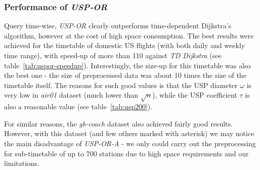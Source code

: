 	\subsubsection{Performance of \textit{USP-OR}}
		
		Query time-wise, \textit{USP-OR} clearly outperforms time-dependent Dijkstra's algorithm, however at the cost of high space consumption. The best results were achieved for the timetable of domestic US flights (with both daily and weekly time range), with speed-up of more than 110 against \textit{TD Dijkstra} (see table~\ref{tab:uspor-speedup}). Interestingly, the size-up for this timetable was also the best one - the size of preprocessed data was about 10 times the size of the timetable itself. The reasons for such good values is that the USP diameter $\omega$ is very low in \textit{air01} dataset (much lower than $\sqrt{n}$), while the USP coefficient $\tau$ is also a reasonable value (see table~\ref{tab:usp200}).
		
		For similar reasons, the \textit{gb-coach} dataset also achieved fairly good results. However, with this dataset (and few others marked with asterisk) we may notice the main disadvantage of \textit{USP-OR-A} - we only could carry out the preprocessing for sub-timetable of up to 700 stations due to high space requirements and our limitations.
			
